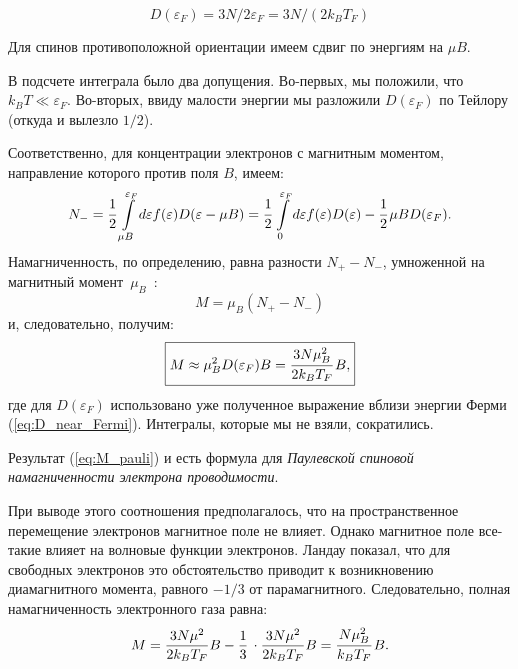 \documentclass[a4paper, 12pt, openany]{book}
\begin{document}
    \begin{equation}
        D(\varepsilon_{F}) = 3N / 2\varepsilon_{F} = 
        3N / (2k_{B} T_{F})
        \label{eq:D_near_Fermi}
    \end{equation}

    Для спинов противоположной ориентации имеем сдвиг по энергиям на $\mu B$.

    В подсчете интеграла было два допущения.
    Во-первых, мы положили, что $k_{B}T \ll \varepsilon_{F}$.
    Во-вторых, ввиду малости энергии мы разложили $D(\varepsilon_{F})$ по Тейлору (откуда и вылезло $1 / 2$).

    Соответственно, для концентрации электронов с магнитным моментом, направление которого против поля $B$, имеем:
    \begin{equation}
        N_{-} = \cfrac{1}{2}\, \int\limits_{\mu B}^{\varepsilon_{F}} d\varepsilon f(\varepsilon) D(\varepsilon - \mu B) =
        \cfrac{1}{2}\, \int\limits_{0}^{\varepsilon_{F}} d\varepsilon f(\varepsilon) D(\varepsilon) - \cfrac{1}{2}\, \mu B D(\varepsilon_{F}).
        \label{eq:N-}
    \end{equation}
    Намагниченность, по определению, равна разности $N_{+} - N_{-}$, умноженной на магнитный момент~$\mu_{B}$~:
    \begin{equation}
        M = \mu_{B} (N_{+} - N_{-})
        \label{eq:M_definition}
    \end{equation}
    и, следовательно, получим:
    \begin{equation}
        \boxed{
            M \approx \mu_B^2 D(\varepsilon_{F}) B = 
            \cfrac{3 N\mu_B^2}{2k_{B} T_{F}}\, B,
        }
        \label{eq:M_pauli}
    \end{equation}
    где для $D(\varepsilon_F)$ использовано уже полученное выражение вблизи энергии Ферми (\ref{eq:D_near_Fermi}). Интегралы, которые мы не взяли, сократились.

    Результат (\ref{eq:M_pauli}) и есть формула для \textit{Паулевской спиновой намагниченности электрона проводимости}.

    При выводе этого соотношения предполагалось, что на пространственное перемещение электронов магнитное поле не влияет.
    Однако магнитное поле все-такие влияет на волновые функции электронов.
    Ландау показал, что для свободных электронов это обстоятельство приводит к возникновению диамагнитного момента, равного $-1 / 3$ от парамагнитного.
    Следовательно, полная намагниченность электронного газа равна:
    \begin{equation}
        M = \frac{3 N \mu^{2}}{2 k_{B} T_{F}} B - \frac{1}{3}\, \cdot  \frac{3 N \mu^{2}}{2 k_{B} T_{F}} B = 
        \cfrac{N \mu_{B}^2}{k_{B}T_{F}}\, B.
        \label{eq:M_with_landau_total}
    \end{equation}
\end{document}
